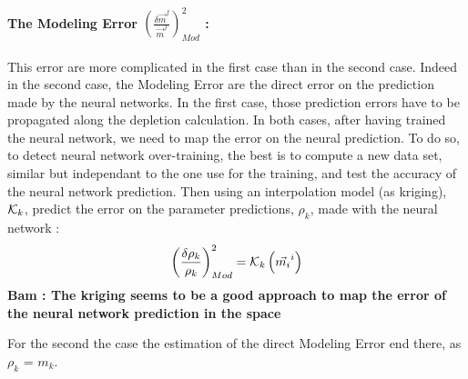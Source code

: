 \documentclass[dvips,12pt]{article}
\newcommand{\comment}[1]
{{\bfseries \color{red} #1}}
\begin{document}
\paragraph{The Modeling Error $\left( \frac{\delta \vec{m}^{f}}{\vec{m}^{f}} \right)^{2} _{Mod}$ : \\}
This error are more complicated in the first case
than in the second case. Indeed in the second case,
the Modeling Error are the direct error on the
prediction made by the neural networks.
In the first case, those prediction errors have to
be propagated along the depletion calculation.
In both cases, after having trained the neural
network, we need to map the error on the neural
prediction.
To do so, to detect neural network over-training,
the best is to compute a new data set, similar but
independant to the one use for the training, and
test the accuracy of the neural network prediction.
Then using an interpolation model (as kriging),
${\cal K}_k$,  predict the error on the parameter
predictions, $\rho_k$,  made with the neural
network :
\begin{equation}
  \left( \frac{\delta \rho_k}{\rho_k} \right)^{2} _{Mod} = {\cal K}_k \left( \vec{m_i}^{i} \right)
\end{equation}
\comment{ Bam : The kriging seems to be a good
approach to map the error of the neural network
prediction in the space}

For the second the case the estimation of the
direct Modeling Error end there, as $\rho_k$ = $m_k$.
\end{document}
